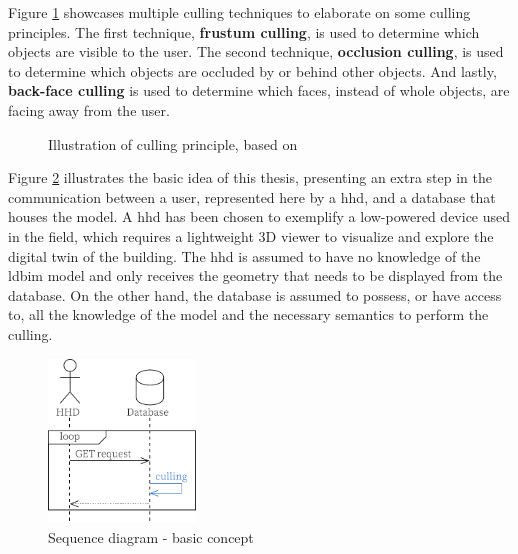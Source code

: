 Figure \ref{fig:cullingPrinciple} showcases multiple culling techniques to elaborate on some culling principles. The first technique, \textbf{frustum culling}, is used to determine which objects are visible to the user. The second technique, \textbf{occlusion culling}, is used to determine which objects are occluded by or behind other objects. And lastly, \textbf{back-face culling} is used to determine which faces, instead of whole objects, are facing away from the user.

\begin{figure}[h]
    \centering
    
    \caption[Illustration of culling principle]{Illustration of culling principle, based on \cite{CullingPrinciples}}
    \label{fig:cullingPrinciple}
\end{figure}

Figure \ref{fig:firstIdea} illustrates the basic idea of this thesis, presenting an extra step in the communication between a user, represented here by a \ac{hhd}, and a database that houses the model. A \ac{hhd} has been chosen to exemplify a low-powered device used in the field, which requires a lightweight 3D viewer to visualize and explore the digital twin of the building. The \ac{hhd} is assumed to have no knowledge of the \ac{ldbim} model and only receives the geometry that needs to be displayed from the database. On the other hand, the database is assumed to possess, or have access to, all the knowledge of the model and the necessary semantics to perform the culling.

\begin{figure}[H]
    \centering
    \includegraphics[width=0.35\textwidth]{figures/pdf/first idea.pdf}
    \caption{Sequence diagram - basic concept}
    \label{fig:firstIdea}
\end{figure}


